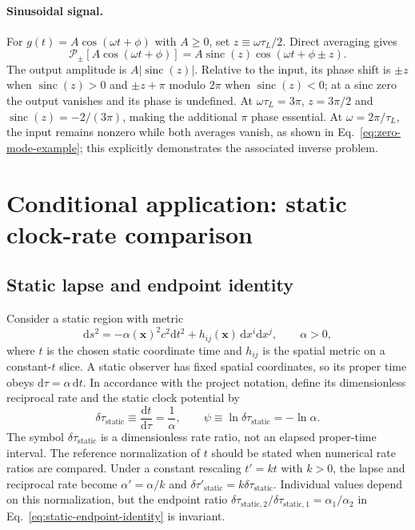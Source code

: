 \documentclass[12pt]{article}
\begin{document}
\paragraph{Sinusoidal signal.}
For $g(t)=A\cos(\omega t+\phi)$ with $A\geq0$, set $z\equiv\omega\tau_L/2$. Direct averaging gives
\begin{equation}
  \mathcal{P}_{\pm}[A\cos(\omega t+\phi)]
  =A\operatorname{sinc}(z)\cos(\omega t+\phi\pm z).
\end{equation}
The output amplitude is $A|\operatorname{sinc}(z)|$. Relative to the input, its phase shift is $\pm z$ when $\operatorname{sinc}(z)>0$ and $\pm z+\pi$ modulo $2\pi$ when $\operatorname{sinc}(z)<0$; at a sinc zero the output vanishes and its phase is undefined. At $\omega\tau_L=3\pi$, $z=3\pi/2$ and $\operatorname{sinc}(z)=-2/(3\pi)$, making the additional $\pi$ phase essential. At $\omega=2\pi/\tau_L$, the input remains nonzero while both averages vanish, as shown in Eq.~\eqref{eq:zero-mode-example}; this explicitly demonstrates the associated inverse problem.

\section{Conditional application: static clock-rate comparison}

\subsection{Static lapse and endpoint identity}

Consider a static region with metric
\begin{equation}
  \mathrm{d}s^2=-\alpha(\mathbf{x})^2c^2\mathrm{d}t^2
  +h_{ij}(\mathbf{x})\,\mathrm{d}x^i\mathrm{d}x^j,
  \qquad \alpha>0,
  \label{eq:static-metric}
\end{equation}
where $t$ is the chosen static coordinate time and $h_{ij}$ is the spatial metric on a constant-$t$ slice. A static observer has fixed spatial coordinates, so its proper time obeys $\mathrm{d}\tau=\alpha\,\mathrm{d}t$. In accordance with the project notation, define its dimensionless reciprocal rate and the static clock potential by
\begin{equation}
  \delta\tau_{\mathrm{static}}\equiv\frac{\mathrm{d}t}{\mathrm{d}\tau}
  =\frac{1}{\alpha},
  \qquad
  \psi\equiv\ln\delta\tau_{\mathrm{static}}=-\ln\alpha.
  \label{eq:static-rate-potential}
\end{equation}
The symbol $\delta\tau_{\mathrm{static}}$ is a dimensionless rate ratio, not an elapsed proper-time interval. The reference normalization of $t$ should be stated when numerical rate ratios are compared. Under a constant rescaling $t'=kt$ with $k>0$, the lapse and reciprocal rate become $\alpha'=\alpha/k$ and $\delta\tau'_{\mathrm{static}}=k\delta\tau_{\mathrm{static}}$. Individual values depend on this normalization, but the endpoint ratio $\delta\tau_{\mathrm{static},2}/\delta\tau_{\mathrm{static},1}=\alpha_1/\alpha_2$ in Eq.~\eqref{eq:static-endpoint-identity} is invariant.
\end{document}
